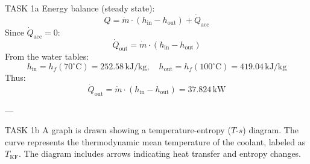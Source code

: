 TASK 1a  
Energy balance (steady state):  
\[
Q = \dot{m} \cdot (h_{\text{in}} - h_{\text{out}}) + \dot{Q}_{\text{acc}}
\]  
Since \(\dot{Q}_{\text{acc}} = 0\):  
\[
\dot{Q}_{\text{out}} = \dot{m} \cdot (h_{\text{in}} - h_{\text{out}})
\]  
From the water tables:  
\[
h_{\text{in}} = h_f(70^\circ\text{C}) = 252.58 \, \text{kJ/kg}, \quad h_{\text{out}} = h_f(100^\circ\text{C}) = 419.04 \, \text{kJ/kg}
\]  
Thus:  
\[
\dot{Q}_{\text{out}} = \dot{m} \cdot (h_{\text{in}} - h_{\text{out}}) = 37.824 \, \text{kW}
\]  

---

TASK 1b  
A graph is drawn showing a temperature-entropy (\(T\)-\(s\)) diagram. The curve represents the thermodynamic mean temperature of the coolant, labeled as \(T_{\text{KF}}\). The diagram includes arrows indicating heat transfer and entropy changes.